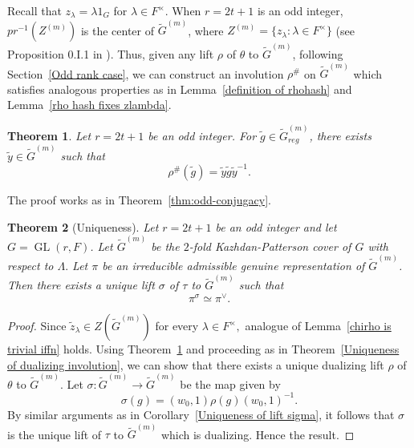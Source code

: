 \documentclass[11pt, a4paper, reqno]{amsart}
\newtheorem{theorem}{Theorem}[section]
\theoremstyle{definition}
\theoremstyle{remark}
\theoremstyle{example}
\theoremstyle{note}
\numberwithin{equation}{section}
\DeclareMathOperator{\GL}{GL}
\begin{document}
Recall that $z_{\lambda} = \lambda 1_{G}$ for $\lambda \in F^{\times}$. When $r = 2t+1$ is an odd integer, $pr^{-1}(Z^{(m)})$ is the center of $\widetilde{G}^{(m)}$, where $Z^{(m)}=\{z_{\lambda} : \lambda \in F^{\times} \}$ (see Proposition 0.I.1 in \cite{KazPat[2]}). Thus, given any lift $\rho$  of  $\theta$ to  $\widetilde{G}^{(m)}$, following Section~\ref{Odd rank case}, we can construct an involution $\rho^{\#}$ on $\widetilde{G}^{(m)}$ which satisfies analogous properties as in Lemma~\ref{definition of rhohash} and Lemma~\ref{rho hash fixes zlambda}. 

\begin{theorem}\label{thm:odd-conjugacy for twisted covers}Let $r =2t+1$ be an odd integer. For $\tilde{g}\in \widetilde{G}^{(m)}_{reg}$, there exists $\tilde{y}\in \widetilde{G}^{(m)}$ such that 
\[\rho^{\#}(\tilde{g})=\tilde{y}\tilde{g}\tilde{y}^{-1}.
\]
\end{theorem}

The proof works as in Theorem~\ref{thm:odd-conjugacy}.

 
\begin{theorem}[Uniqueness] Let $r =2t+1$ be an odd integer and let $G=\GL(r,F)$. Let $\widetilde{G}^{(m)}$ be the $2$-fold Kazhdan-Patterson cover of $G$ with respect to $\Lambda.$ Let $\pi$ be an irreducible admissible genuine representation of $\widetilde{G}^{(m)}$. Then there exists a unique lift $\sigma$ of $\tau$ to $\widetilde{G}^{(m)}$ such that
\[\pi^{\sigma}\simeq \pi^{\vee}.\]
\end{theorem}


\begin{proof}
Since $\tilde{z}_\lambda \in Z(\widetilde{G}^{(m)})$ for every $ \lambda \in F^\times,$ analogue of Lemma~\ref{chirho is trivial iffn} holds. Using Theorem~\ref{thm:odd-conjugacy for twisted covers} and proceeding as in Theorem~\ref{Uniqueness of dualizing involution}, we can show that there exists a unique dualizing lift $\rho$ of $\theta$ to $\widetilde{G}^{(m)}$.  Let $\sigma: \widetilde{G}^{(m)} \to \widetilde{G}^{(m)}$ be the map given by 
\[\sigma(g)=(w_0,1)\rho(g)(w_0,1)^{-1}.\] By similar arguments as in Corollary~\ref{Uniqueness of lift sigma}, it follows that  $\sigma$ is the unique lift of $\tau$ to $\widetilde{G}^{(m)}$ which is dualizing. Hence the result. 
\end{proof}
\end{document}
